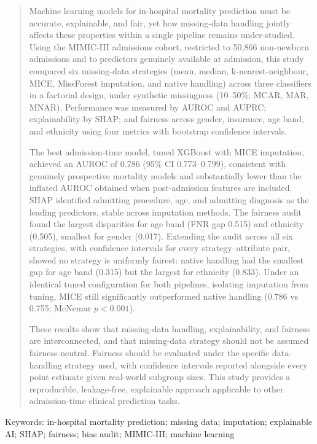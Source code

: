 \documentclass[12pt,a4paper]{report}
\begin{document}
\begin{quote}
\small
Machine learning models for in-hospital mortality prediction must be accurate, explainable, and fair, yet how missing-data handling jointly affects these properties within a single pipeline remains under-studied. Using the MIMIC-III admissions cohort, restricted to 50,866 non-newborn admissions and to predictors genuinely available at admission, this study compared six missing-data strategies (mean, median, k-nearest-neighbour, MICE, MissForest imputation, and native handling) across three classifiers in a factorial design, under synthetic missingness (10--50\%; MCAR, MAR, MNAR). Performance was measured by AUROC and AUPRC; explainability by SHAP; and fairness across gender, insurance, age band, and ethnicity using four metrics with bootstrap confidence intervals.

The best admission-time model, tuned XGBoost with MICE imputation, achieved an AUROC of 0.786 (95\% CI 0.773--0.799), consistent with genuinely prospective mortality models and substantially lower than the inflated AUROC obtained when post-admission features are included. SHAP identified admitting procedure, age, and admitting diagnosis as the leading predictors, stable across imputation methods. The fairness audit found the largest disparities for age band (FNR gap 0.515) and ethnicity (0.505), smallest for gender (0.017). Extending the audit across all six strategies, with confidence intervals for every strategy--attribute pair, showed no strategy is uniformly fairest: native handling had the smallest gap for age band (0.315) but the largest for ethnicity (0.833). Under an identical tuned configuration for both pipelines, isolating imputation from tuning, MICE still significantly outperformed native handling (0.786 vs 0.755; McNemar $p<0.001$).

These results show that missing-data handling, explainability, and fairness are interconnected, and that missing-data strategy should not be assumed fairness-neutral. Fairness should be evaluated under the specific data-handling strategy used, with confidence intervals reported alongside every point estimate given real-world subgroup sizes. This study provides a reproducible, leakage-free, explainable approach applicable to other admission-time clinical prediction tasks.
\end{quote}

Keywords: in-hospital mortality prediction; missing data; imputation; explainable AI; SHAP; fairness; bias audit; MIMIC-III; machine learning
\end{document}
